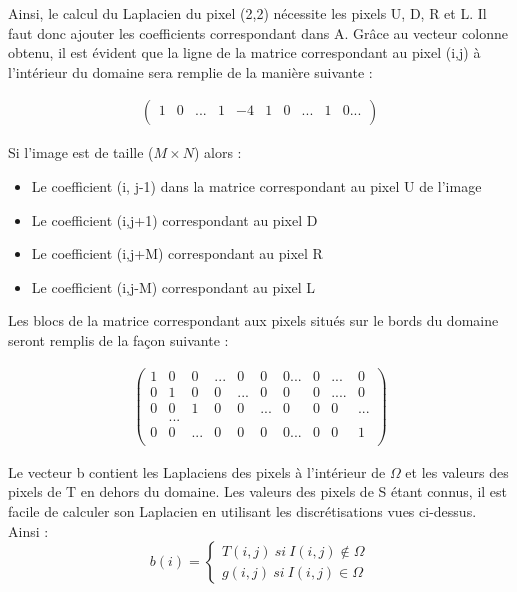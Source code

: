Ainsi, le calcul du Laplacien du pixel (2,2) nécessite les pixels U, D, R et L. Il faut donc ajouter les coefficients correspondant dans A. Grâce au vecteur colonne obtenu, il est évident que la ligne de la matrice correspondant au pixel (i,j) à l'intérieur du domaine sera remplie de la manière  suivante : 
\begin{center}
\begin{equation}
\left.
\begin{aligned}
\begin{pmatrix}
	1 & 0 & ... &  1 &-4 & 1 & 0 & ... & 1 & 0... \\
\end{pmatrix}
\end{aligned}
\right.
\end{equation}
\end{center}
Si l'image est de taille ($M\times N$) alors : 
\begin{itemize}
\item Le coefficient (i, j-1) dans la matrice correspondant au pixel U de l'image
\item Le coefficient (i,j+1) correspondant au pixel D
\item Le coefficient (i,j+M) correspondant au pixel R
\item Le coefficient (i,j-M) correspondant au pixel L
\end{itemize}

Les blocs de la matrice correspondant aux pixels situés sur le bords du domaine seront remplis de la façon suivante : 
\begin{center}
\begin{equation}
\left.
\begin{aligned}
\begin{pmatrix}
	1 & 0& 0 & ...& 0 & 0 & 0...&0& ... & 0\\
	0 & 1 & 0 & 0 & ... & 0 &0 &0&....&0\\
	0 & 0 & 1 & 0 & 0&... &0 &0 &0&...\\
	&...\\
	0 & 0 &... &0 &0 &0 &0...& 0& 0 & 1\\
\end{pmatrix}
\end{aligned}
\right.
\end{equation}
\end{center}
Le vecteur b contient les Laplaciens des pixels à l'intérieur de $\Omega$ et les valeurs des pixels de T en dehors du domaine. 
Les valeurs des pixels de S étant connus, il est facile de calculer son Laplacien en utilisant les discrétisations vues ci-dessus. Ainsi : 
\begin{equation*}
b(i) = 
\left\{
\begin{aligned}
T(i,j) \ si \ I (i,j) \notin \Omega\\
g(i,j) \ si \ I( i,j) \in \Omega
\end{aligned}
\right.
\end{equation*}

